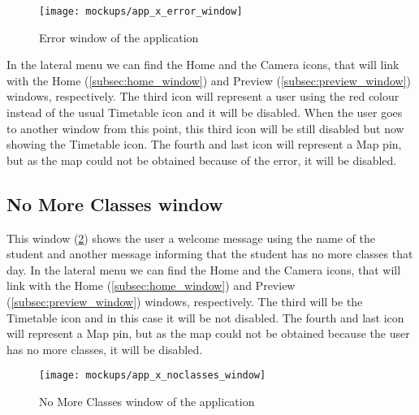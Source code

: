 	\begin{figure}[!ht]
		\centering
		\texttt{[image: mockups/app\_x\_error\_window]}
		\caption{Error window of the application}
		\label{fig:error_window}
	\end{figure}	

	In the lateral menu we can find the Home and the Camera icons, that will link with the Home (\ref{subsec:home_window}) and Preview (\ref{subsec:preview_window}) windows, respectively. The third icon will represent a user using the red colour instead of the usual Timetable icon and it will be disabled. When the user goes to another window from this point, this third icon will be still disabled but now showing the Timetable icon. The fourth and last icon will represent a Map pin, but as the map could not be obtained because of the error, it will be disabled.

	\subsection{No More Classes window}
	\label{subsec:no_classes}
	This window (\ref{fig:no_classes_window}) shows the user a welcome message using the name of the student and another message informing that the student has no more classes that day. In the lateral menu we can find the Home and the Camera icons, that will link with the Home (\ref{subsec:home_window}) and Preview (\ref{subsec:preview_window}) windows, respectively. The third will be the Timetable icon and in this case it will be not disabled.
	The fourth and last icon will represent a Map pin, but as the map could not be obtained because the user has no more classes, it will be disabled.

	\begin{figure}[!ht]
		\centering
		\texttt{[image: mockups/app\_x\_noclasses\_window]}
		\caption{No More Classes window of the application}
		\label{fig:no_classes_window}
	\end{figure}	



                                                                                              

